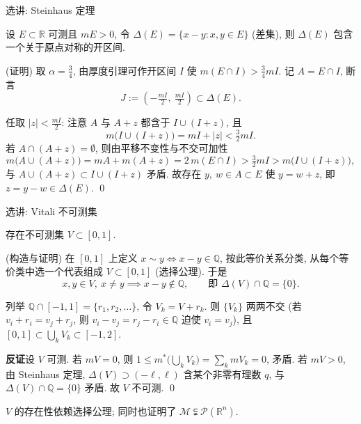
\begin{frame}{选讲: Steinhaus 定理}

\begin{thm}[Steinhaus]
设 $E \subset \mathbb{R}$ 可测且 $mE > 0$, 令 $\Delta(E) = \{x - y : x, y \in E\}$ (差集), 则 $\Delta(E)$ 包含一个关于原点\alert{对称}的开区间.
\end{thm}

\startproof[bg=yellow, fg=red](证明)
取 $\alpha = \tfrac34$, 由厚度引理可作开区间 $I$ 使 $m(E \cap I) > \tfrac34 mI$. 记 $A = E \cap I$, 断言
\[
J := \left(-\tfrac{mI}{2},\ \tfrac{mI}{2}\right) \subset \Delta(E).
\]

\pause

任取 $|z| < \tfrac{mI}{2}$: 注意 $A$ 与 $A + z$ 都含于 $I \cup (I + z)$, 且
\[
m\big(I \cup (I+z)\big) = mI + |z| < \tfrac32 mI .
\]
若 $A \cap (A + z) = \emptyset$, 则由平移不变性与不交可加性
\[
m\big(A \cup (A+z)\big) = mA + m(A + z) = 2\,m(E \cap I) > \tfrac32 mI > m\big(I \cup (I+z)\big),
\]
与 $A \cup (A+z) \subset I \cup (I+z)$ 矛盾. 故存在 $y,\ w \in A \subset E$ 使 $y = w + z$, 即 $z = y - w \in \Delta(E)$.
\qed

\end{frame}


\begin{frame}{选讲: Vitali 不可测集}

\begin{thm}[Vitali]
存在不可测集 $V \subset [0, 1]$.
\end{thm}

\startproof[bg=yellow, fg=red](构造与证明)
在 $[0,1]$ 上定义 $x \sim y \iff x - y \in \mathbb{Q}$, 按此等价关系分类, \alert{从每个等价类中选一个代表}组成 $V \subset [0,1]$ (选择公理). 于是
\[
x, y \in V,\ x \neq y \implies x - y \notin \mathbb{Q}, \qquad \text{即 } \Delta(V) \cap \mathbb{Q} = \{0\}.
\]

\pause

列举 $\mathbb{Q} \cap [-1, 1] = \{r_1, r_2, \ldots\}$, 令 $V_k = V + r_k$. 则 $\{V_k\}$ \alert{两两不交} (若 $v_i + r_i = v_j + r_j$, 则 $v_i - v_j = r_j - r_i \in \mathbb{Q}$ 迫使 $v_i = v_j$), 且 $[0,1] \subset \bigcup_k V_k \subset [-1, 2]$.

\pause

\textbf{反证}设 $V$ 可测. 若 $mV = 0$, 则 $1 \leqslant m^*\big(\bigcup_k V_k\big) = \sum_k mV_k = 0$, 矛盾. 若 $mV > 0$, 由 Steinhaus 定理, $\Delta(V) \supset (-\ell, \ell)$ 含某个\alert{非零有理数} $q$, 与 $\Delta(V) \cap \mathbb{Q} = \{0\}$ 矛盾. 故 $V$ 不可测.
\qed

\begin{attnblock}
$V$ 的存在性依赖\alert{选择公理}; 同时也证明了 $\mathscr{M} \subsetneqq \mathscr{P}(\mathbb{R}^n)$.
\end{attnblock}

\end{frame}

